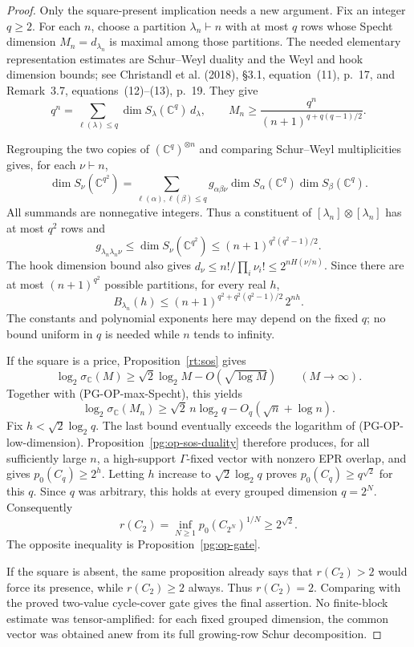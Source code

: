 \begin{proof}
Only the square-present implication needs a new argument. Fix an integer
$q\geq2$. For each $n$, choose a partition $\lambda_n\vdash n$ with at
most $q$ rows whose Specht dimension $M_n=d_{\lambda_n}$ is maximal
among those partitions. The needed elementary representation estimates
are Schur--Weyl duality and the Weyl and hook dimension bounds; see
Christandl et al. (2018), \S3.1, equation~(11), p.~17, and
Remark~3.7, equations~(12)--(13), p.~19. They give
\[
 q^n=\sum_{\ell(\lambda)\leq q}
          \dim S_\lambda(\mathbb C^q)\,d_\lambda,
 \qquad
 M_n\geq\frac{q^n}{(n+1)^{q+q(q-1)/2}}.
 \tag{PG-OP-max-Specht}
\]

Regrouping the two copies of $(\mathbb C^q)^{\otimes n}$ and comparing
Schur--Weyl multiplicities gives, for each $\nu\vdash n$,
\[
 \dim S_\nu(\mathbb C^{q^2})
 =\sum_{\ell(\alpha),\ell(\beta)\leq q}
       g_{\alpha\beta\nu}
       \dim S_\alpha(\mathbb C^q)
       \dim S_\beta(\mathbb C^q).
 \tag{PG-OP-multiplicity-bound}
\]
All summands are nonnegative integers. Thus a constituent of
$[\lambda_n]\otimes[\lambda_n]$ has at most $q^2$ rows and
\[
 g_{\lambda_n\lambda_n\nu}
 \leq\dim S_\nu(\mathbb C^{q^2})
 \leq(n+1)^{q^2(q^2-1)/2}.
\]
The hook dimension bound also gives
$d_\nu\leq n!/\prod_i\nu_i!\leq2^{nH(\nu/n)}$. Since there are at
most $(n+1)^{q^2}$ possible partitions, for every real $h$,
\[
 B_{\lambda_n}(h)
 \leq (n+1)^{q^2+q^2(q^2-1)/2}\,2^{nh}.
 \tag{PG-OP-low-dimension}
\]
The constants and polynomial exponents here may depend on the fixed
$q$; no bound uniform in $q$ is needed while $n$ tends to infinity.

If the square is a price, Proposition~\ref{rt:sos} gives
\[
 \log_2\sigma_{\mathbb C}(M)
       \geq\sqrt2\log_2M-O(\sqrt{\log M})
       \qquad(M\longrightarrow\infty).
\]
Together with (PG-OP-max-Specht), this yields
\[
 \log_2\sigma_{\mathbb C}(M_n)
       \geq\sqrt2\,n\log_2q-O_q(\sqrt n+\log n).
\]
Fix $h<\sqrt2\log_2q$. The last bound eventually exceeds the
logarithm of (PG-OP-low-dimension). Proposition~\ref{pg:op-sos-duality}
therefore produces, for all sufficiently large $n$, a high-support
$\Gamma$-fixed vector with nonzero EPR overlap, and gives
$p_0(C_q)\geq2^h$. Letting $h$ increase to $\sqrt2\log_2q$ proves
$p_0(C_q)\geq q^{\sqrt2}$ for this $q$. Since $q$ was arbitrary, this
holds at every grouped dimension $q=2^N$. Consequently
\[
 r(C_2)=\inf_{N\geq1}p_0(C_{2^N})^{1/N}
       \geq2^{\sqrt2}.
\]
The opposite inequality is Proposition~\ref{pg:op-gate}.

If the square is absent, the same proposition already says that
$r(C_2)>2$ would force its presence, while $r(C_2)\geq2$ always.
Thus $r(C_2)=2$. Comparing with the proved two-value cycle-cover gate
gives the final assertion. No finite-block estimate was tensor-amplified:
for each fixed grouped dimension, the common vector was obtained anew
from its full growing-row Schur decomposition.
\end{proof}


